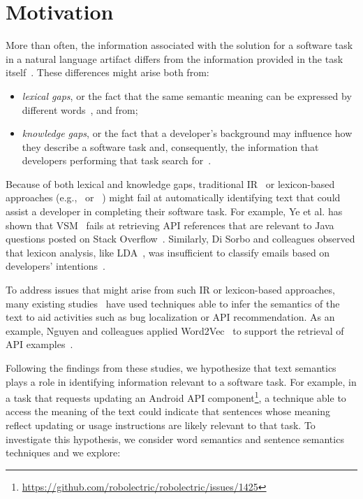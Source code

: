 \section{Motivation}
\label{cp5:motivation}



More than often, the information associated 
with the solution for a software task in a natural language artifact differs from the information provided in the task itself~\cite{silva2019, Ye2016}.
These differences might arise both from:

\begin{itemize}
    \item \textit{lexical gaps}, or the fact that the same semantic meaning can be expressed by different words~\cite{Huang2018}, and from;
    \item \textit{knowledge gaps},
    or the fact that a developer's background may 
    influence how they describe a software task and, consequently,
    the information that developers performing that task search for~\cite{Kevic2014}.
\end{itemize}








Because of both lexical and knowledge gaps, traditional \acf{IR}~\cite{Manning2009IR} or lexicon-based approaches (e.g.,~\cite{Ponzanelli2015} or ~\cite{Xu2017}) might fail at automatically identifying text that could assist a developer in completing their software task. 
For example, Ye et al. has shown that \acf{VSM}~\cite{salton1975vector} 
 fails at retrieving API references that are relevant to Java questions
posted on Stack Overflow~\cite{Ye2016}.
Similarly,
Di Sorbo and colleagues observed that lexicon analysis, like \acs{LDA}~\cite{blei2003latent}, was insufficient to classify 
emails based on developers' intentions~\cite{Sorbo2015}.



To address issues that might arise from such \acs{IR} or lexicon-based approaches, many existing studies~\cite{silva2019, Huang2018, Ye2016} have used 
techniques able to infer the semantics of the text to aid activities such as bug localization or API recommendation. As an example, Nguyen and colleagues applied Word2Vec~\cite{Mikolov2013space} to support the retrieval of API examples~\cite{nguyen2017}.



Following the findings from these studies, we hypothesize that text semantics plays a role in identifying information relevant to a software task. 
For example, in a task that requests updating an Android API component\footnote{\url{https://github.com/robolectric/robolectric/issues/1425}}, a technique
able to access the meaning of the text could indicate that sentences whose meaning reflect updating or usage instructions
are likely relevant to that task.
To investigate this hypothesis, we consider 
word semantics and sentence semantics techniques and we explore: 



